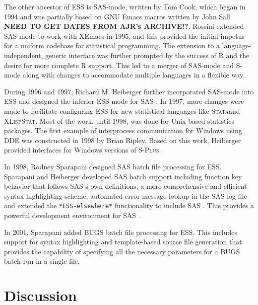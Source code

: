 \documentclass{article}
\newcommand*{\SAS}{\textsc{SAS}{\textregistered} }
\newcommand*{\Splus}{\textsc{S-Plus}}
\newcommand*{\XLispStat}{\textsc{XLispStat}}
\newcommand*{\Stata}{\textsc{Stata}}
\newcommand{\stexttt}[1]{{\small\texttt{#1}}}
\begin{document}
The other ancestor of ESS is SAS-mode,
written by Tom Cook, which began in 1994 and was partially based on
GNU Emacs macros written by John Sall \textbf{NEED TO GET
  DATES FROM AJR's ARCHIVE!?}.  Rossini extended SAS-mode to work with
XEmacs in 1995, and this provided the initial
impetus for a uniform codebase for statistical programming.
The extension to a language-independent, generic interface was further prompted
by the success of R and the desire for more complete R support.  This led to a merger
of SAS-mode and S-mode along with changes
to accommodate multiple languages in a flexible way.

During 1996 and 1997, Richard M. Heiberger further incorporated
SAS-mode into ESS and designed the inferior ESS mode for \SAS.  In
1997, more changes were made to facilitate
configuring ESS for new statistical languages like \Stata and \XLispStat.
Most of the work, until 1998, was done for Unix-based statistics packages.
The first example of interprocess communication for Windows using DDE
was constructed in 1998 by Brian Ripley.  Based on this work, Heiberger provided
interfaces for Windows versions of \Splus.

In 1998, Rodney Sparapani designed \SAS batch file processing for ESS.
Sparapani and Heiberger developed \SAS batch support including function
key behavior that follows \SAS{\'s} own definitions,
a more comprehensive and efficient syntax highlighting scheme,
automated error message lookup in the \SAS log file and extended the
\stexttt{*ESS-elsewhere*} functionality to include \SAS.  This provides
a powerful development environment for \SAS.

In 2001, Sparapani added BUGS batch file processing for ESS.  This
includes support for syntax highlighting and template-based source file
generation that provides the capability of specifying all the necessary
parameters for a BUGS batch run in a single file.

\section{Discussion}
\label{sec:discussion}
\end{document}
